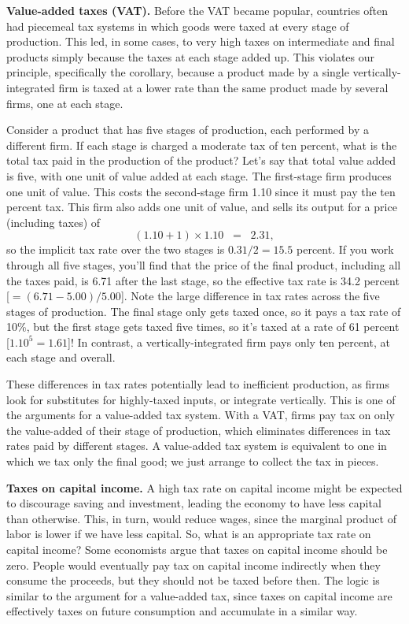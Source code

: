 \textbf{Value-added taxes (VAT).}
Before the VAT became popular, countries often had piecemeal
tax systems in which goods were taxed at every stage
of production.
This led, in some cases,
to very high taxes on intermediate and final products
simply because the taxes at each stage added up.
This violates our principle, specifically the corollary,
because a product made by a single vertically-integrated firm is taxed
at a lower rate than the same product made by several firms,
one at each stage.

Consider a product that has five stages of production,
each performed by a different firm.
If each stage is charged a moderate tax of ten percent,
what is the total tax paid in the production
of the product?
Let's say that total value added is five, with one
unit of value added at each stage.
The first-stage firm produces one unit of value.
This costs the second-stage firm 1.10
since it must pay the ten percent tax.
This firm also adds one unit of value,
and sells its output for a price (including taxes) of
\[
    \left( 1.10 + 1 \right) \times 1.10 \;\;=\;\; 2.31,
\]
so the implicit tax rate over the two stages is
$ 0.31/2 = 15.5$ percent.
If you work through all five stages,
you'll find that the price of the final product,
including all the taxes paid,
is 6.71 after the last stage, so the effective tax rate is 34.2 percent
[$= (6.71-5.00)/5.00$].
Note the large difference
in tax rates across the five stages of production.
The final stage only gets taxed once, so it pays a tax rate of 10\%,
but the first stage gets taxed five times, so
it's taxed at a rate of 61 percent [$1.10^5 = 1.61$]!
In contrast, a vertically-integrated firm pays only ten percent, at each stage and overall.

These differences in tax rates potentially lead to
inefficient production,
as firms look for substitutes for highly-taxed inputs,
or integrate vertically.
This is one of the arguments for a value-added tax system.
With a VAT, firms pay tax on only the value-added of their
stage of production, which eliminates differences in tax rates
paid by different stages.
A value-added tax system is equivalent to one
in which we tax only the final good;
we just arrange to collect the tax in pieces.


\textbf{Taxes on capital income. }
A high tax rate on capital income might be expected
to discourage saving and investment,
leading the economy to have less capital than otherwise.
This, in turn, would reduce wages, since
the marginal product of labor is lower if we have less capital.
So, what is an appropriate tax rate on capital income?
Some economists argue that taxes on capital income should be zero.
People would eventually pay tax on capital income indirectly
when they consume the proceeds,
but they should not be taxed before then.
The logic is similar to the argument for a value-added tax,
since taxes on capital income are effectively taxes on future
consumption and accumulate in a similar way.


